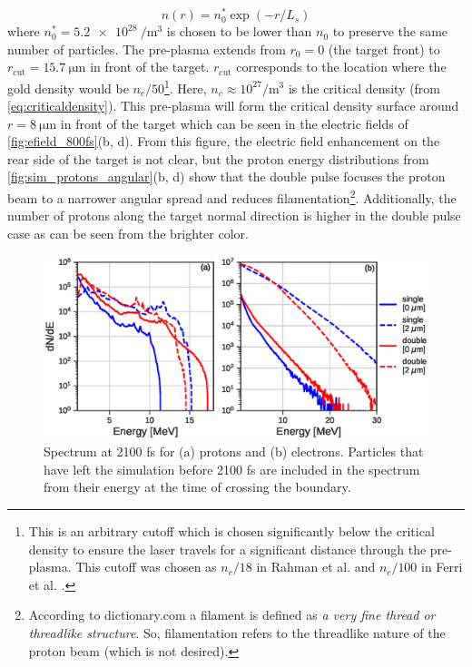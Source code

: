 \begin{equation}
	n(r) = n_0^* \exp(-r / L_s) \label{eq:exponential_scale_pp}
\end{equation}
where $n_0^* = \SI{5.2e28}{\per \meter \cubed}$ is chosen to be lower than $n_0$ to preserve the same number of particles. The pre-plasma extends from $r_0=0$ (the target front) to $r_\text{cut} = \SI{15.7}{\micro \meter}$ in front of the target. $r_\text{cut}$ corresponds to the location where the gold density would be $n_c / 50$\footnote{This is an arbitrary cutoff which is chosen significantly below the critical density to ensure the laser travels for a significant distance through the pre-plasma. This cutoff was chosen as $n_c / 18$ in Rahman et al. \cite{Rahman_2021_PoP} and $n_c / 100$ in Ferri et al. \cite{Ferri_2019_Nat_Comm}.}. Here, $n_c \approx 10^{27} \unit{\per \meter \cubed}$ is the critical density (from \autoref{eq:criticaldensity}). This pre-plasma will form the critical density surface around $r = \SI{8}{\micro \meter}$ in front of the target which can be seen in the electric fields of \autoref{fig:efield_800fs}(b, d). From this figure, the electric field enhancement on the rear side of the target is not clear, but the proton energy distributions from \autoref{fig:sim_protons_angular}(b, d) show that the double pulse focuses the proton beam to a narrower angular spread and reduces filamentation\footnote{According to dictionary.com a filament is defined as \emph{a very fine thread or threadlike structure}. So, filamentation refers to the threadlike nature of the proton beam (which is not desired).}. Additionally, the number of protons along the target normal direction is higher in the double pulse case as can be seen from the brighter color. 

\begin{figure}
	\centering
	\includegraphics[width=0.9\linewidth]{planning/images/titan/spectrum_2100fs.eps}
	\caption{Spectrum at 2100 fs for (a) protons and (b) electrons. Particles that have left the simulation before 2100 fs are included in the spectrum from their energy at the time of crossing the boundary.}
	\label{fig:sim_spectrum}
\end{figure}

